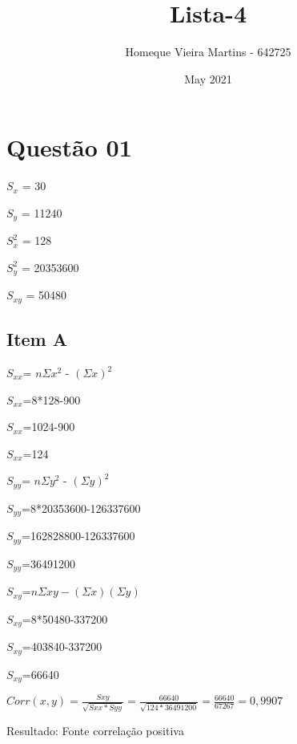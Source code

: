 \documentclass{article}
\title{Lista-4}
\author{Homeque Vieira Martins - 642725}
\date{May 2021}
\begin{document}
\maketitle
\section{Questão 01}

    \begin{flushleft}
    
    $S_x$ = 30
    
    $S_y$ = 11240
    
    $S_x^2$ = 128
    
    $S_y^2$ = 20353600
    
    $S_{xy}$ = 50480

    \end{flushleft}
    
        \subsection{Item A}

            \begin{flushleft}

            $S_{xx}$= $n\Sigma x^2$ - $(\Sigma x)^2$ 
            
            $S_{xx}$=8*128-900

            $S_{xx}$=1024-900
            
            $S_{xx}$=124

            \end{flushleft}
        
            \begin{flushleft}
                $S_{yy}$= $n\Sigma y^2$ - $(\Sigma y)^2$

                $S_{yy}$=8*20353600-126337600

                $S_{yy}$=162828800-126337600

                $S_{yy}$=36491200

            \end{flushleft}

            \begin{flushleft}

               $S_{xy}$=$n\Sigma xy-(\Sigma x)(\Sigma y)$
               
               $S_{xy}$=8*50480-337200
               
               $S_{xy}$=403840-337200 
               
               $S_{xy}$=66640 
    
            \end{flushleft}

            \begin{flushleft}
                $Corr(x,y) = \frac{Sxy}{\sqrt{Sxx * Syy}} = \frac{66640}{\sqrt{124 * 36491200}} = \frac{66640}{67267} = 0,9907 $

            \end{flushleft}
            
            Resultado: Fonte correlação positiva
\end{document}
